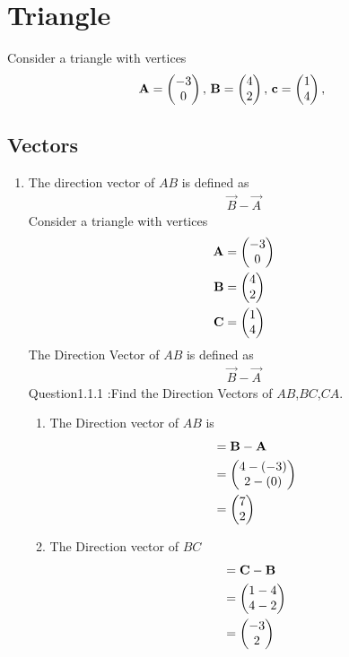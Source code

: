\documentclass[11pt]{book}
\begin{document}
\frontmatter
\tableofcontents
\setcounter{page}{1}
\mainmatter
\chapter{Triangle}
Consider a triangle with vertices
\begin{align}
\label{eq:tri-pts}
\vec{A}=\myvec{-3 \\ 0},\,
\vec{B}=\myvec{4\\2},\,
	\vec{c}=\myvec{1\\4},\,
\end{align}
\section{Vectors}
\begin{enumerate}[label=\thesection.\arabic*.,ref=\thesection.\theenumi]

\item The direction vector of $AB$ is defined as
		\begin{align}
			\vec{B}-
			\vec{A}
		\end{align}
Consider a triangle with vertices
\begin{align} 
 \mathbf{A} &= \begin{pmatrix} -3\\ 0 \end{pmatrix} \\ \mathbf{B} &= \begin{pmatrix} 4\\ 2 \end{pmatrix}
  \\\mathbf{C} &= \begin{pmatrix} 1\\ 4\end{pmatrix}
 \end{align}
The Direction Vector of $AB$ is defined as 
\begin{align} 
\vec{B} - \vec{A}
\end{align}
Question1.1.1 :Find the Direction Vectors of $AB$,$BC$,$CA$.\\
\solution

\begin{enumerate} 
\item  The Direction vector of $AB$ is \begin{align} &= \mathbf{B} - \mathbf{A} \\
 &= \begin{pmatrix}4 - (-3)\\ 2 - (0) \end{pmatrix} \\&= \begin{pmatrix} 7\\ 2 \end{pmatrix}
 \end{align}
 
\item The Direction vector of $BC$ \begin{align}&= \vec{C} - \vec{B}\\
 &= \myvec{ 1 - 4\\ 4 - 2 } \\&= \myvec{-3\\ 2 }
  \end{align}
  

\end{enumerate}
\end{enumerate}
\end{document}
